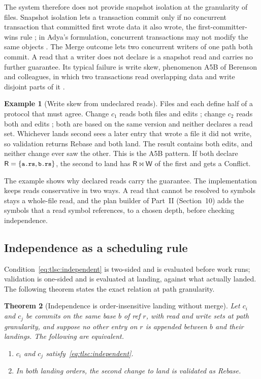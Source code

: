\documentclass[11pt,letterpaper]{article}
\newtheorem{theorem}{Theorem}[section]
\theoremstyle{definition}
\newtheorem{example}[theorem]{Example}
\theoremstyle{remark}
\newcommand{\R}{\mathsf{R}}
\newcommand{\W}{\mathsf{W}}
\newcommand{\meets}{\bowtie}
\newcommand{\mcode}[1]{\text{\texttt{\small #1}}}
\begin{document}
The system therefore does not provide snapshot isolation at the granularity of files. Snapshot isolation lets a transaction commit only if no concurrent transaction that committed first wrote data it also wrote, the first-committer-wins rule \cite{berenson1995critique}; in Adya's formulation, concurrent transactions may not modify the same objects \cite[Section 4.3]{adya1999thesis}. The Merge outcome lets two concurrent writers of one path both commit. A read that a writer does not declare is a snapshot read and carries no further guarantee. Its typical failure is write skew, phenomenon A5B of Berenson and colleagues, in which two transactions read overlapping data and write disjoint parts of it \cite{berenson1995critique}.

\begin{example}[Write skew from undeclared reads]
\label{ex:tlsc:skew}
Files  and  each define half of a protocol that must agree. Change $c_1$ reads both files and edits ; change $c_2$ reads both and edits ; both are based on the same version and neither declares a read set. Whichever lands second sees a later entry that wrote a file it did not write, so validation returns Rebase and both land. The result contains both edits, and neither change ever saw the other. This is the A5B pattern. If both declare $\R=\{\mcode{a.rs},\mcode{b.rs}\}$, the second to land has $\R\meets\W$ of the first and gets a Conflict.
\end{example}

The example shows why declared reads carry the guarantee. The implementation keeps reads conservative in two ways. A read that cannot be resolved to symbols stays a whole-file read, and the plan builder of Part~II (Section~10) adds the symbols that a read symbol references, to a chosen depth, before checking independence.

\subsection{Independence as a scheduling rule}
\label{sec:tlsc:eq1}

Condition~\eqref{eq:tlsc:independent} is two-sided and is evaluated before work runs; validation is one-sided and is evaluated at landing, against what actually landed. The following theorem states the exact relation at path granularity.

\begin{theorem}[Independence is order-insensitive landing without merge]
\label{thm:tlsc:eq1}
Let $c_i$ and $c_j$ be commits on the same base $b$ of ref $r$, with read and write sets at path granularity, and suppose no other entry on $r$ is appended between $b$ and their landings. The following are equivalent.
\begin{enumerate}
\item $c_i$ and $c_j$ satisfy~\eqref{eq:tlsc:independent}.
\item In both landing orders, the second change to land is validated as Rebase.
\end{enumerate}
\end{theorem}
\end{document}
